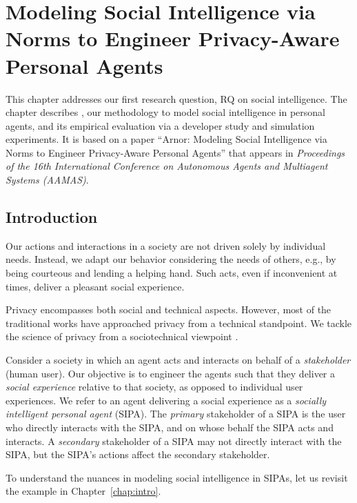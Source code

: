 \chapter[Modeling Social Intelligence via Norms]{Modeling Social Intelligence via Norms to Engineer Privacy-Aware Personal Agents}
\label{chap:arnor}

This chapter addresses our first research question, RQ on social intelligence. The chapter describes \frameworkA, our methodology to model social
intelligence in personal agents, and its empirical evaluation via a
developer study and simulation experiments. It is based on a
paper ``Arnor: Modeling Social Intelligence via Norms to Engineer
Privacy-Aware Personal Agents'' that appears in \emph{Proceedings of the
16th International Conference on Autonomous Agents and Multiagent
Systems (AAMAS)}.

\section{Introduction}
\label{sec:arnor-intro}

Our actions and interactions in a society are not driven solely by
individual needs. Instead, we adapt our behavior considering the needs
of others, e.g., by being courteous and lending a helping hand. Such
acts, even if inconvenient at times, deliver a pleasant social
experience.

Privacy encompasses both social and technical aspects. However, most of
the traditional works have approached privacy from a technical
standpoint. We tackle the science of privacy from a sociotechnical
viewpoint \citep{Kafali-IS16-Revani,WWW-16:IOSE}.

Consider a society in which an agent acts and interacts on behalf of a
\emph{stakeholder} (human user). Our objective is to engineer the agents
such that they deliver a \emph{social experience} relative to that
society, as opposed to individual user experiences. We refer to an agent
delivering a social experience as a \emph{socially intelligent personal
agent} (SIPA). The \emph{primary} stakeholder of a SIPA is the user who
directly interacts with the SIPA, and on whose behalf the SIPA acts and
interacts. A \emph{secondary} stakeholder of a SIPA may not directly
interact with the SIPA, but the SIPA's actions affect the secondary
stakeholder.

To understand the nuances in modeling social intelligence in SIPAs, 
let us revisit the example in Chapter~\ref{chap:intro}. 

